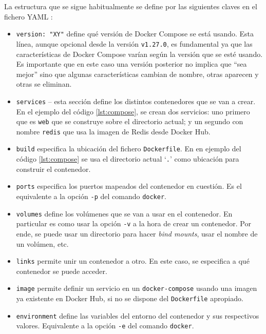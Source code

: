 La estructura que se sigue habitualmente se define por las siguientes claves
en el fichero YAML \cite{DockerComposeTutorial}:

\begin{itemize}
  \item \texttt{version: "XY"} define qué versión de Docker Compose se está 
        usando. Esta línea, aunque opcional desde la versión \texttt{v1.27.0},
        es fundamental ya que las características de Docker Compose varían según
        la versión que se esté usando. Es importante que en este caso una versión
        posterior no implica que ``sea mejor'' sino que algunas características
        cambian de nombre, otras aparecen y otras se eliminan.
  \item \texttt{services} -- esta sección define los distintos contenedores que
        se van a crear. En el ejemplo del código \ref{lst:compose}, se crean dos
        servicios: uno primero que es \texttt{web} que se construye sobre el
        directorio actual; y un segundo con nombre \texttt{redis} que usa la
        imagen de Redis desde Docker Hub.
  \item \texttt{build} especifica la ubicación del fichero \texttt{Dockerfile}. En
        en ejemplo del código \ref{lst:compose} se usa el directorio actual `\texttt{.}'
        como ubicación para construir el contenedor.
  \item \texttt{ports} especifica los puertos mapeados del contenedor en cuestión.
        Es el equivalente a la opción \lstinline[style=bash]!-p! del comando
        \texttt{docker}.
  \item \texttt{volumes} define los volúmenes que se van a usar en el contenedor.
        En particular es como usar la opción \lstinline[style=bash]!-v! a la hora
        de crear un contenedor. Por ende, se puede usar un directorio para hacer
        \textit{bind mounts}, usar el nombre de un volúmen, etc.
  \item \texttt{links} permite unir un contenedor a otro. En este caso, se especifica
        a qué contenedor se puede acceder.
  \item \texttt{image} permite definir un servicio en un \texttt{docker-compose}
        usando una imagen ya existente en Docker Hub, si no se dispone del
        \texttt{Dockerfile} apropiado.
  \item \texttt{environment} define las variables del entorno del contenedor
        y sus respectivos valores. Equivalente a la opción \lstinline[style=bash]!-e!
        del comando \texttt{docker}.
\end{itemize}

